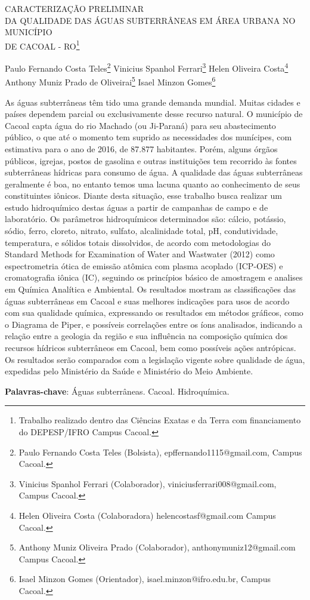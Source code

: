 \documentclass[article,12pt,onesidea,4paper,english,brazil]{abntex2}
\begin{document}
	
	
	\frenchspacing 
	
	\begin{center}
		\LARGE CARACTERIZAÇÃO PRELIMINAR \\DA QUALIDADE DAS ÁGUAS SUBTERRÂNEAS EM ÁREA URBANA NO MUNICÍPIO \\DE CACOAL - RO\footnote{Trabalho realizado dentro das Ciências Exatas e da Terra com financiamento do DEPESP/IFRO Campus Cacoal.}
		
		\normalsize
		Paulo Fernando Costa Teles\footnote{Paulo Fernando Costa Teles (Bolsista), epffernando1115@gmail.com, Campus Cacoal.} 
	Vinicius Spanhol Ferrari\footnote{Vinicius Spanhol Ferrari (Colaborador), viniciusferrari008@gmail.com, Campus Cacoal.} 
		Helen Oliveira Costa\footnote{Helen Oliveira Costa (Colaboradora) helencostasf@gmail.com Campus Cacoal.} \\
		Anthony Muniz Prado de Oliveirai\footnote{Anthony Muniz Oliveira Prado (Colaborador), anthonymuniz12@gmail.com Campus Cacoal.}
		Isael Minzon Gomes\footnote{Isael Minzon Gomes (Orientador), isael.minzon@ifro.edu.br, Campus Cacoal.} 
	\end{center}
	
	\noindent As águas subterrâneas têm tido uma grande demanda mundial. Muitas cidades e países dependem parcial ou exclusivamente desse recurso natural. O município de Cacoal capta água do rio Machado (ou Ji-Paraná) para seu abastecimento público, o que até o momento tem suprido as necessidades dos munícipes, com estimativa para o ano de 2016, de 87.877 habitantes. Porém, alguns órgãos públicos, igrejas, postos de gasolina e outras instituições tem recorrido às fontes subterrâneas hídricas para consumo de água. A qualidade das águas subterrâneas geralmente é boa, no entanto temos uma lacuna quanto ao conhecimento de seus constituintes iônicos. Diante desta situação, esse trabalho busca realizar um estudo hidroquímico destas águas a partir de campanhas de campo e de laboratório. Os parâmetros hidroquímicos determinados são: cálcio, potássio, sódio, ferro, cloreto, nitrato, sulfato, alcalinidade total, pH, condutividade, temperatura, e sólidos totais dissolvidos, de acordo com metodologias do Standard Methods for Examination of Water and Wastwater (2012) como espectrometria ótica de emissão atômica com plasma acoplado (ICP-OES) e cromatografia iônica (IC), seguindo os princípios básico de amostragem e analises em Química Analítica e Ambiental. Os resultados mostram as classificações das águas subterrâneas em Cacoal e suas melhores indicações para usos de acordo com sua qualidade química, expressando os resultados em métodos gráficos, como o Diagrama de Piper, e possíveis correlações entre os íons analisados, indicando a relação entre a geologia da região e sua influência na composição química dos recursos hídricos subterrâneos em Cacoal, bem como possíveis ações antrópicas. Os resultados serão comparados com a legislação vigente sobre qualidade de água, expedidas pelo Ministério da Saúde e Ministério do Meio Ambiente.
	
	\vspace{\onelineskip}
	
	\noindent
	\textbf{Palavras-chave}: Águas subterrâneas. Cacoal. Hidroquímica.
	
\end{document}

